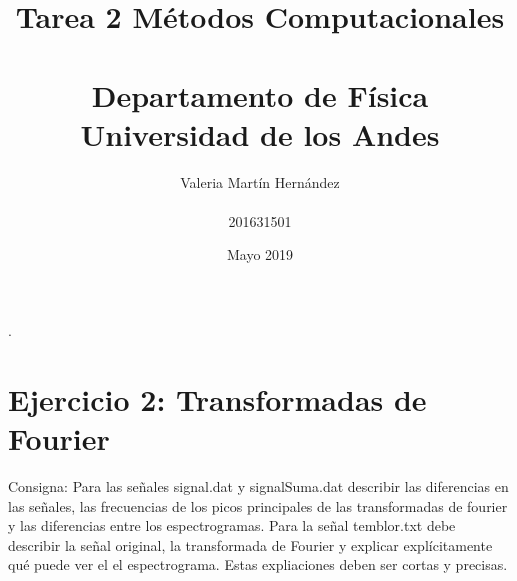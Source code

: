 \documentclass[11pt,letterpaper]{exam}
\title{Tarea 2 Métodos Computacionales\\\\ Departamento de Física \\ Universidad de los Andes}
\author{Valeria Martín Hernández\\\\201631501}
\date{Mayo 2019}
\begin{document}
\maketitle
.\newline\newline\newline\newline\newline\newline\newline\newline\newline\newline\newline\newline\newline\newline\newline\newline\newline\newline\newline\newline\newline\newline\newline\newline\newline\newline

\maketitle

\section{Ejercicio 2: Transformadas de Fourier}
Consigna:
Para las señales signal.dat y signalSuma.dat describir las diferencias en las señales, las frecuencias de
los picos principales de las transformadas de fourier y las diferencias entre los espectrogramas.
Para la señal temblor.txt debe describir la señal original, la transformada de Fourier y explicar
explícitamente qué puede ver el el espectrograma.
Estas expliaciones deben ser cortas y precisas.
\end{document}
